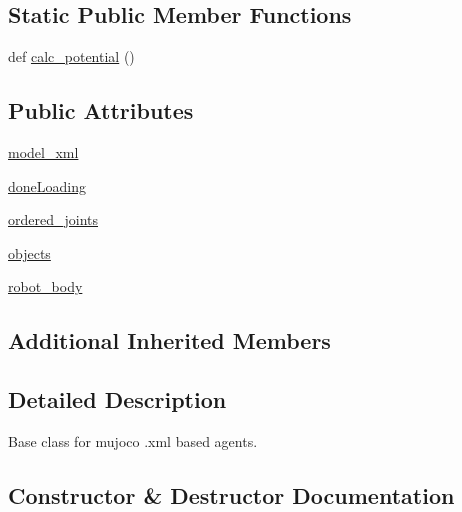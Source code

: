 \subsection*{Static Public Member Functions}
\begin{DoxyCompactItemize}
\item 
def \hyperlink{classpybullet-gym_1_1pybulletgym_1_1envs_1_1roboschool_1_1robots_1_1robot__bases_1_1_m_j_c_f_based_robot_a6e6cf06c46bd009046bdbf454802a92b}{calc\+\_\+potential} ()
\end{DoxyCompactItemize}
\subsection*{Public Attributes}
\begin{DoxyCompactItemize}
\item 
\hyperlink{classpybullet-gym_1_1pybulletgym_1_1envs_1_1roboschool_1_1robots_1_1robot__bases_1_1_m_j_c_f_based_robot_a11643c59de09c51259063b96d99d1d41}{model\+\_\+xml}
\item 
\hyperlink{classpybullet-gym_1_1pybulletgym_1_1envs_1_1roboschool_1_1robots_1_1robot__bases_1_1_m_j_c_f_based_robot_a39476aa42589a556ec66a880093671f8}{done\+Loading}
\item 
\hyperlink{classpybullet-gym_1_1pybulletgym_1_1envs_1_1roboschool_1_1robots_1_1robot__bases_1_1_m_j_c_f_based_robot_a23aa21f96973f705d38f4d2cdecb1dba}{ordered\+\_\+joints}
\item 
\hyperlink{classpybullet-gym_1_1pybulletgym_1_1envs_1_1roboschool_1_1robots_1_1robot__bases_1_1_m_j_c_f_based_robot_ad577922dc6c623b32621c134d3eca6f1}{objects}
\item 
\hyperlink{classpybullet-gym_1_1pybulletgym_1_1envs_1_1roboschool_1_1robots_1_1robot__bases_1_1_m_j_c_f_based_robot_aac85844bda3f8e14a316388a3a4dffeb}{robot\+\_\+body}
\end{DoxyCompactItemize}
\subsection*{Additional Inherited Members}


\subsection{Detailed Description}
\begin{DoxyVerb}Base class for mujoco .xml based agents.
\end{DoxyVerb}
 

\subsection{Constructor \& Destructor Documentation}
